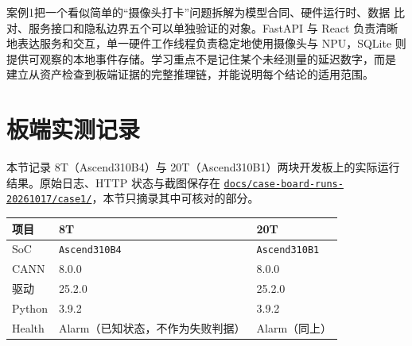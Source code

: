 案例1把一个看似简单的``摄像头打卡''问题拆解为模型合同、硬件运行时、数据
比对、服务接口和隐私边界五个可以单独验证的对象。FastAPI 与 React
负责清晰 地表达服务和交互，单一硬件工作线程负责稳定地使用摄像头与
NPU，SQLite 则
提供可观察的本地事件存储。学习重点不是记住某个未经测量的延迟数字，而是
建立从资产检查到板端证据的完整推理链，并能说明每个结论的适用范围。

\section{板端实测记录}\label{src-experiment-case1-board-evidence}

本节记录 8T（Ascend310B4）与
20T（Ascend310B1）两块开发板上的实际运行结果。原始日志、HTTP
状态与截图保存在
\href{https://github.com/zhouxzh/Ascend310/blob/main/docs/case-board-runs-20261017/case1/README.md}{\passthrough{\lstinline!docs/case-board-runs-20261017/case1/!}}，本节只摘录其中可核对的部分。

\begin{longtable}[]{@{}lll@{}}
\toprule\noalign{}
项目 & 8T & 20T \\
\midrule\noalign{}
\endhead
\bottomrule\noalign{}
\endlastfoot
SoC & \passthrough{\lstinline!Ascend310B4!} &
\passthrough{\lstinline!Ascend310B1!} \\
CANN & 8.0.0 & 8.0.0 \\
驱动 & 25.2.0 & 25.2.0 \\
Python & 3.9.2 & 3.9.2 \\
Health & Alarm（已知状态，不作为失败判据） & Alarm（同上） \\
\end{longtable}

